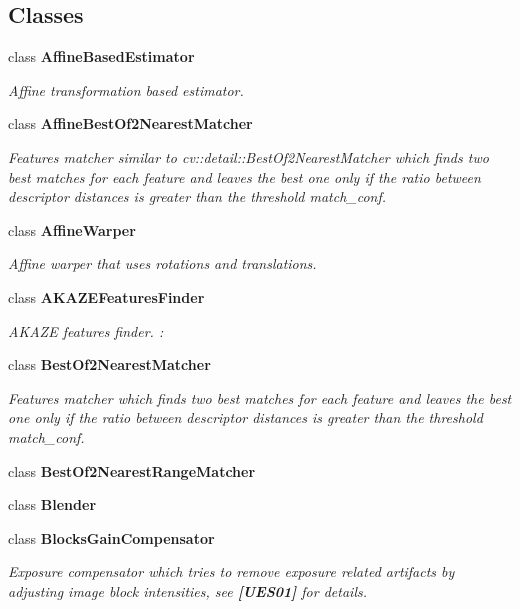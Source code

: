 \subsection*{Classes}
\begin{DoxyCompactItemize}
\item 
class {\bfseries Affine\+Based\+Estimator}
\begin{DoxyCompactList}\small\item\em Affine transformation based estimator. \end{DoxyCompactList}\item 
class {\bfseries Affine\+Best\+Of2\+Nearest\+Matcher}
\begin{DoxyCompactList}\small\item\em Features matcher similar to cv\+::detail\+::\+Best\+Of2\+Nearest\+Matcher which finds two best matches for each feature and leaves the best one only if the ratio between descriptor distances is greater than the threshold match\+\_\+conf. \end{DoxyCompactList}\item 
class {\bfseries Affine\+Warper}
\begin{DoxyCompactList}\small\item\em Affine warper that uses rotations and translations. \end{DoxyCompactList}\item 
class {\bfseries A\+K\+A\+Z\+E\+Features\+Finder}
\begin{DoxyCompactList}\small\item\em A\+K\+A\+ZE features finder. \+: \end{DoxyCompactList}\item 
class {\bfseries Best\+Of2\+Nearest\+Matcher}
\begin{DoxyCompactList}\small\item\em Features matcher which finds two best matches for each feature and leaves the best one only if the ratio between descriptor distances is greater than the threshold match\+\_\+conf. \end{DoxyCompactList}\item 
class {\bfseries Best\+Of2\+Nearest\+Range\+Matcher}
\item 
class {\bfseries Blender}
\item 
class {\bfseries Blocks\+Gain\+Compensator}
\begin{DoxyCompactList}\small\item\em Exposure compensator which tries to remove exposure related artifacts by adjusting image block intensities, see {\bfseries [U\+E\+S01]} for details. \end{DoxyCompactList}\item 

\end{DoxyCompactItemize}
